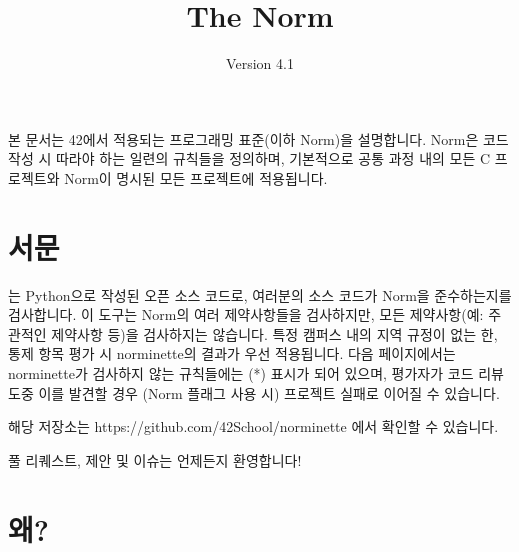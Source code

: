 \documentclass{42-ko}
\begin{document}
\title{The Norm}
\subtitle{Version 4.1}

\summary
{
    본 문서는 42에서 적용되는 프로그래밍 표준(이하 Norm)을 설명합니다.
    Norm은 코드 작성 시 따라야 하는 일련의 규칙들을 정의하며, 기본적으로 
    공통 과정 내의 모든 C 프로젝트와 Norm이 명시된 모든 프로젝트에 적용됩니다.
}

\maketitle

\tableofcontents



\chapter{서문}

는 Python으로 작성된 오픈 소스 코드로, 여러분의 소스 코드가 
Norm을 준수하는지를 검사합니다. 이 도구는 Norm의 여러 제약사항들을 검사하지만, 
모든 제약사항(예: 주관적인 제약사항 등)을 검사하지는 않습니다. 특정 캠퍼스 내의 
지역 규정이 없는 한, 통제 항목 평가 시 norminette의 결과가 우선 적용됩니다. 
다음 페이지에서는 norminette가 검사하지 않는 규칙들에는 (*) 표시가 되어 있으며, 
평가자가 코드 리뷰 도중 이를 발견할 경우 (Norm 플래그 사용 시) 프로젝트 실패로 
이어질 수 있습니다.

해당 저장소는 https://github.com/42School/norminette 에서 확인할 수 있습니다.

풀 리퀘스트, 제안 및 이슈는 언제든지 환영합니다!

\newpage


%
%
    \chapter{왜?}
\end{document}
